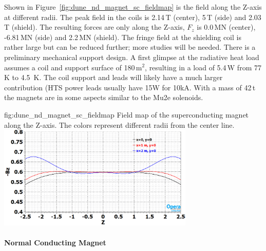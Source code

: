 %
Shown in Figure~\ref{fig:dune_nd_magnet_sc_fieldmap} is the field along the Z-axis at different radii. The peak field in the coils is 2.14\,T (center), 5\,T (side) and 2.03\,T (shield). The resulting forces are only along the Z-axis, $F_{z}$ is 0.0\,MN (center), -6.81\,MN (side) and 2.2\,MN (shield). The fringe field at the shielding coil is rather large but can be reduced further; more studies will be needed. There is a preliminary mechanical support design. A first glimpse at the radiative heat load assumes a coil and support surface of 180\,m$^{2}$, resulting in a load of 5.4\,W from 77\,K to 4.5\, K. The coil support and leads will likely have a much larger contribution (HTS power leads usually have 15W for 10kA. With a mass of 42\,t the magnets are in some aspects similar to the Mu2e solenoids.
%
\begin{dunefigure}{fig:dune_nd_magnet_sc_fieldmap}
{Field map of the superconducting magnet along the Z-axis. The colors represent different radii from the center line.}
\includegraphics[width=0.70\textwidth]{graphics/dune_nd_magnet_sc_fieldmap.png} 
\end{dunefigure}
%
%
\paragraph{Normal Conducting Magnet}

